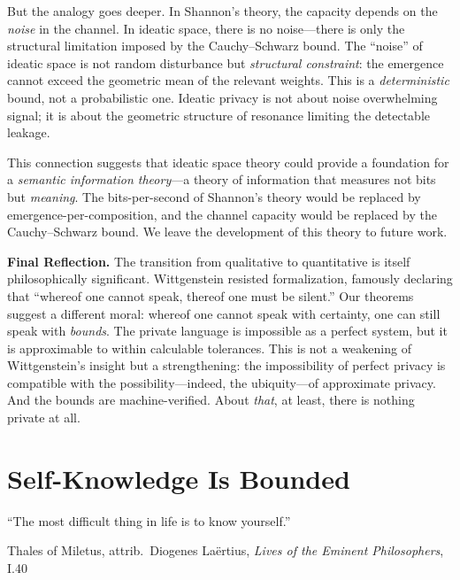 But the analogy goes deeper. In Shannon's theory, the capacity depends
on the \emph{noise} in the channel. In ideatic space, there is no
noise---there is only the structural limitation imposed by the
Cauchy--Schwarz bound. The ``noise'' of ideatic space is not random
disturbance but \emph{structural constraint}: the emergence cannot
exceed the geometric mean of the relevant weights. This is a
\emph{deterministic} bound, not a probabilistic one. Ideatic privacy
is not about noise overwhelming signal; it is about the geometric
structure of resonance limiting the detectable leakage.

This connection suggests that ideatic space theory could provide a
foundation for a \emph{semantic information theory}---a theory of
information that measures not bits but \emph{meaning}. The bits-per-second
of Shannon's theory would be replaced by emergence-per-composition,
and the channel capacity would be replaced by the Cauchy--Schwarz bound.
We leave the development of this theory to future work.

\begin{reflectionbox}
\textbf{Final Reflection.}
The transition from qualitative to quantitative is itself philosophically
significant. Wittgenstein resisted formalization, famously declaring that
``whereof one cannot speak, thereof one must be silent.'' Our theorems
suggest a different moral: whereof one cannot speak with certainty, one
can still speak with \emph{bounds}. The private language is impossible
as a perfect system, but it is approximable to within calculable
tolerances. This is not a weakening of Wittgenstein's insight but a
strengthening: the impossibility of perfect privacy is compatible with
the possibility---indeed, the ubiquity---of approximate privacy. And the
bounds are machine-verified. About \emph{that}, at least, there is
nothing private at all.
\end{reflectionbox}



\chapter{Self-Knowledge Is Bounded}
\label{ch:self-knowledge}

\epigraph{``The most difficult thing in life is to know yourself.''}
{Thales of Miletus, attrib.\ Diogenes La\"ertius, \textit{Lives of the
Eminent Philosophers}, I.40}

